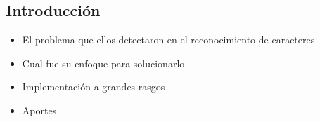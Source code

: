 \subsection{Introducción}

\begin{itemize}
		\item El problema que ellos detectaron en el reconocimiento de caracteres
		\item Cual fue su enfoque para solucionarlo
		\item Implementación a grandes rasgos
		\item Aportes
\end{itemize}
